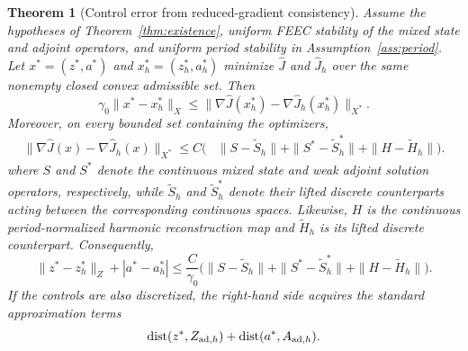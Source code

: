 \documentclass{article}
\newtheorem{theorem}{Theorem}[section]
\begin{document}
\begin{theorem}[Control error from reduced-gradient consistency]
\label{thm:control-error}
Assume the hypotheses of Theorem~\ref{thm:existence}, uniform FEEC stability of the mixed state and adjoint operators, and uniform period stability in Assumption~\ref{ass:period}.  Let $x^*=(z^*,a^*)$ and $x_h^*=(z_h^*,a_h^*)$ minimize $\widehat J$ and $\widehat J_h$ over the same nonempty closed convex admissible set.  Then
\begin{equation}\label{eq:control-error-abstract}
  \gamma_0\|x^*-x_h^*\|_X
  \le
  \|\nabla\widehat J(x_h^*)-\nabla\widehat J_h(x_h^*)\|_{X^*}.
\end{equation}
Moreover, on every bounded set containing the optimizers,
\begin{equation}\label{eq:gradient-consistency}
\begin{aligned}
\|\nabla\widehat J(x)-\nabla\widehat J_h(x)\|_{X^*}
\le C\big(
&\|S-\widetilde S_h\|
+\|S^*-\widetilde S_h^*\|
+\|H-\widetilde H_h\|
\big).
\end{aligned}
\end{equation}
where $S$ and $S^*$ denote the continuous mixed state and weak adjoint
solution operators, respectively, while $\widetilde S_h$ and
$\widetilde S_h^*$ denote their lifted discrete counterparts acting
between the corresponding continuous spaces. Likewise, $H$ is the
continuous period-normalized harmonic reconstruction map and
$\widetilde H_h$ is its lifted discrete counterpart. Consequently,
\begin{equation}\label{eq:control-error-operator}
  \|z^*-z_h^*\|_Z+|a^*-a_h^*|
  \le
  \frac{C}{\gamma_0}
  \big(
    \|S-\widetilde S_h\|
    +\|S^*-\widetilde S_h^*\|
    +\|H-\widetilde H_h\|
  \big).
\end{equation}
If the controls are also discretized, the right-hand side acquires the standard approximation terms
\[
  \operatorname{dist}(z^*,Z_{{\rm ad},h})
  +\operatorname{dist}(a^*,A_{{\rm ad},h}).
\]
\end{theorem}
\end{document}
